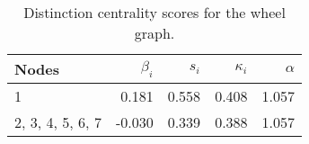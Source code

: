 \begin{table}
\centering
\caption{\label{tab:wheel}Distinction centrality scores for the wheel graph.}
\centering
\begin{tabular}[t]{lrrrr}
\toprule
Nodes & $\beta_i$ & $s_i$ & $\kappa_i$ & $\alpha$\\
\midrule
1 & 0.181 & 0.558 & 0.408 & 1.057\\
2, 3, 4, 5, 6, 7 & -0.030 & 0.339 & 0.388 & 1.057\\
\bottomrule
\end{tabular}
\end{table}
